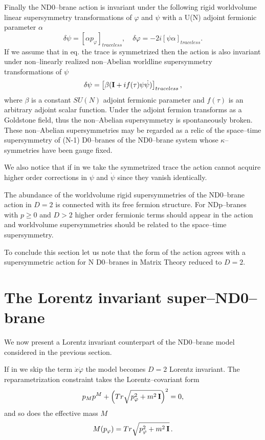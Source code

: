 \documentclass[a4paper,12pt]{article}
\begin{document}
Finally the ND0--brane action  is invariant under the
following rigid worldvolume linear supersymmetry transformations
of
$\varphi$ and
$\psi$ with a U(N) adjoint fermionic parameter $\alpha$
\begin{equation}\label{abel}
\delta\psi=[\alpha p_\varphi]_{traceless},
\quad \delta \varphi=-2i[\psi\alpha]_{traceless}.
\end{equation}
If we assume that in eq.  the trace is symmetrized then the
action is also invariant under non--linearly realized non--Abelian
worldline supersymmetry transformations of $\psi$
\begin{equation}\label{nonl}
\delta\psi=\left[\beta({\bf I}+if(\tau)\psi\dot\psi)\right]_{traceless},
\end{equation}
where $\beta$ is a constant $SU(N)$ adjoint fermionic parameter
and $f(\tau)$ is an arbitrary adjoint scalar function. Under
 the adjoint fermion transforms as a Goldstone
field, thus the non--Abelian supersymmetry  is
spontaneously broken. These non--Abelian supersymmetries may be
regarded as a relic of the  space--time supersymmetry of (N-1)
D0--branes of the ND0--brane system whose $\kappa$--symmetries
have been gauge fixed.

We also notice that if in  we take the symmetrized trace the
action cannot acquire  higher order corrections in $\psi$ and
$\dot\psi$ since they vanish identically.

The abundance of the worldvolume rigid supersymmetries of the
ND0--brane action in $D=2$ is connected with its free fermion
structure. For NDp--branes with $p\geq 0$ and $D>2$ higher order
fermionic terms should appear in the action and worldvolume
supersymmetries should be related to the space--time
supersymmetry.

To conclude this section let us note that the form of the action
 agrees with a supersymmetric action for N D0--branes in Matrix
Theory \cite{Taylor:2000pr} reduced to $D=2$.

\section{The Lorentz invariant super--ND0--brane}

We now present a Lorentz invariant counterpart of the ND0--brane
model considered in the previous section.

If in  we skip the term $\dot x\dot\varphi$ the model
becomes $D=2$ Lorentz invariant. The reparametrization constraint
takes the Lorentz--covariant form
\begin{equation}\label{34}
p_Mp^M+\left(Tr\sqrt{p_\varphi^2+m^2\,{\bf I}}\right)^2=0,
\end{equation}
and so does the effective mass $M$
\begin{equation}\label{35}
M(p_\varphi)=Tr\sqrt{p_\varphi^2+m^2\,{\bf I}}\,.
\end{equation}
\end{document}
